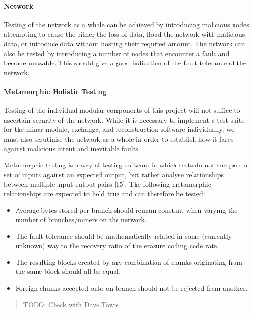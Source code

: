 \documentclass[]{article}
\let\oldparagraph\paragraph
\renewcommand{\paragraph}[1]{\oldparagraph{#1}\mbox{}}
\begin{document}
\hypertarget{header-n135}{%
\paragraph{Network}\label{header-n135}}

Testing of the network as a whole can be achieved by introducing
malicious nodes attempting to cause the either the loss of data, flood
the network with malicious data, or introduce data without hosting their
required amount. The network can also be tested by introducing a number
of nodes that encounter a fault and become unusable. This should give a
good indication of the fault tolerance of the network.

\hypertarget{header-n137}{%
\paragraph{Metamorphic Holistic Testing}\label{header-n137}}

Testing of the individual modular components of this project will not
suffice to ascertain security of the network. While it is necessary to
implement a test suite for the miner module, exchange, and
reconstruction software individually, we must also scrutinise the
network as a whole in order to establish how it fares against malicious
intent and inevitable faults.

Metamorphic testing is a way of testing software in which tests do not
compare a set of inputs against an expected output, but rather analyse
relationships between multiple input-output pairs {[}15{]}. The
following metamorphic relationships are expected to hold true and can
therefore be tested:

\begin{itemize}
\item
  Average bytes stored per branch should remain constant when varying
  the number of branches/miners on the network.
\item
  The fault tolerance should be mathematically related in some
  (currently unknown) way to the recovery ratio of the erasure coding
  code rate.
\item
  The resulting blocks created by any combination of chunks originating
  from the same block should all be equal.
\item
  Foreign chunks accepted onto on branch should not be rejected from
  another.
\end{itemize}

\begin{quote}
TODO: Check with Dave Towie
\end{quote}
\end{document}
